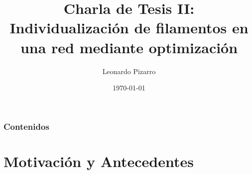 \documentclass[aspectratio=169]{beamer}
\title[Individualizaci\'on de filamentos mediante optimizaci\'on]{Charla de Tesis II: Individualizaci\'on de filamentos en una red mediante optimizaci\'on}
\author[L.\ Pizarro]{Leonardo Pizarro} %
\date{\today} %
\institute[]{Profesor Gu\'ia: Mauricio Cerda\\Profesor Co-gu\'ia: Jacques Dumais}
\begin{document}
	{
		\maketitle
	}
	\addtocounter{framenumber}{-1} %

\begin{frame}
\frametitle{Contenidos} 
\tableofcontents
\end{frame}

\section{Motivaci\'on y Antecedentes}
\end{document}

